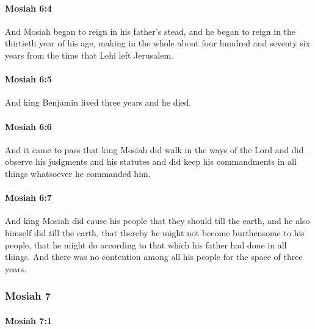 		\paragraph{Mosiah 6:4} %
			\label{MOSIAH-6-4}

			And Mosiah began to reign in his father's stead,
			and he began to reign in the thirtieth year of his age,
			making in the whole about four hundred and seventy six years
			from the time that Lehi left Jerusalem.

		\paragraph{Mosiah 6:5} %
			\label{MOSIAH-6-5}

			And king Benjamin lived three years and he died.

		\paragraph{Mosiah 6:6} %
			\label{MOSIAH-6-6}

			And it came to pass that king Mosiah did walk in the ways of the Lord
			and did observe his judgments and his statutes
			and did keep his commandments in all things whatsoever he commanded him.

		\paragraph{Mosiah 6:7} %
			\label{MOSIAH-6-7}

			And king Mosiah did cause his people that they should till the earth,
			and he also himself did till the earth,
			that thereby he might not become burthensome to his people,
			that he might do according to that which his father had done in all things.
			And there was no contention among all his people for the space of three years.
			
	\subsubsection{Mosiah 7} %
		\label{MOSIAH-7}
		
		\paragraph{Mosiah 7:1} %
			\label{MOSIAH-7-1}

